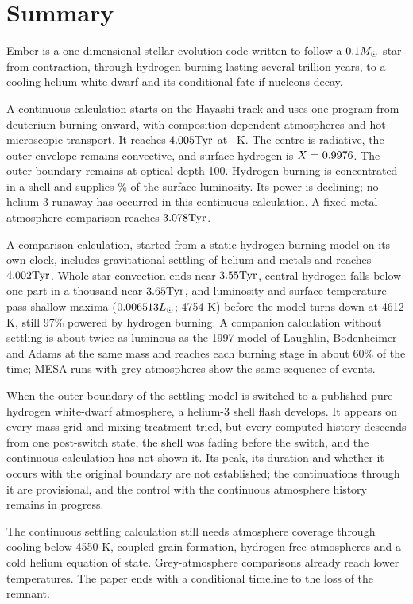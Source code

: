 \section*{Summary}
Ember is a one-dimensional stellar-evolution code written to follow a
$0.1M_\odot$ star from contraction, through hydrogen burning lasting several
trillion years, to a cooling helium white dwarf and its conditional fate if
nucleons decay.

A continuous calculation starts on the Hayashi track and uses one program
from deuterium burning onward, with composition-dependent atmospheres and
hot microscopic transport. It reaches $4.005\mathrm{Tyr}$ at
\continuousTemperature\ K. The centre is radiative, the outer envelope
remains convective, and surface hydrogen is $X=0.9976$.
The outer boundary remains at optical depth 100.
Hydrogen burning is concentrated in a shell and supplies
\continuousNuclearPercent\% of the surface luminosity. Its power is declining;
no helium-3 runaway has occurred in this continuous calculation.
A fixed-metal atmosphere comparison reaches $3.078\mathrm{Tyr}$.

A comparison calculation, started from a static hydrogen-burning
model on its own clock, includes gravitational settling of helium and
metals and reaches $4.002\mathrm{Tyr}$. Whole-star convection ends near
$3.55\mathrm{Tyr}$, central hydrogen falls below one part in a thousand near
$3.65\mathrm{Tyr}$, and luminosity and surface temperature pass shallow maxima
($0.006513L_\odot$; 4754 K) before the model turns down at 4612 K, still
97\% powered by hydrogen burning. A companion calculation without settling
is about twice as luminous as the 1997 model of Laughlin, Bodenheimer and
Adams at the same mass and reaches each burning stage in about 60\% of the
time; MESA runs with grey atmospheres show the same sequence of events.

When the outer boundary of the settling model is switched to a published
pure-hydrogen white-dwarf atmosphere, a helium-3 shell flash develops. It
appears on every mass grid and mixing treatment tried, but every computed
history descends from one post-switch state, the shell was fading before
the switch, and the continuous calculation has not shown it. Its peak, its duration and
whether it occurs with the original boundary are not established; the
continuations through it are provisional, and the control with the
continuous atmosphere history remains in progress.

The continuous settling calculation still needs atmosphere coverage through
cooling below 4550 K, coupled grain formation, hydrogen-free atmospheres and
a cold helium equation of state. Grey-atmosphere comparisons already reach
lower temperatures. The paper ends with a conditional timeline to the loss
of the remnant.
